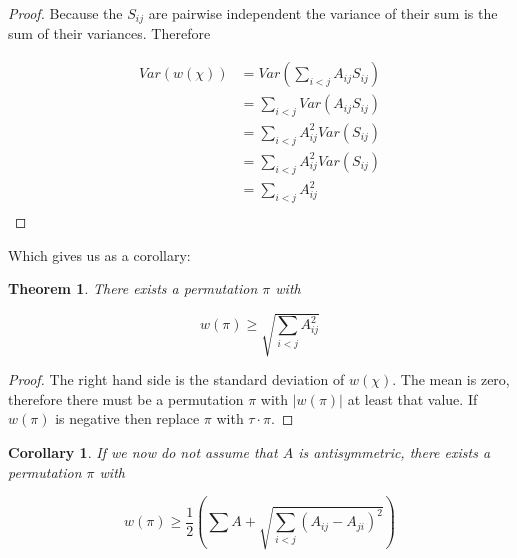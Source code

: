 \documentclass[a4paper,10pt]{article}
\newtheorem{theorem}{Theorem}
\newtheorem{corollary}{Corollary}[theorem]
\begin{document}
\begin{proof}
Because the $S_{ij}$ are pairwise independent the variance of their sum is the sum of their variances. Therefore

\begin{align*}
Var(w(\chi)) &= Var(\sum_{i < j} A_{ij} S_{ij}) \\
&= \sum_{i < j} Var(A_{ij} S_{ij}) \\
&= \sum_{i < j} A_{ij}^2 Var(S_{ij}) \\
&= \sum_{i < j} A_{ij}^2 Var(S_{ij}) \\
&= \sum_{i < j} A_{ij}^2  \\
\end{align*}
\end{proof}

Which gives us as a corollary:

\begin{theorem}
There exists a permutation $\pi$ with 

\[ w(\pi) \geq \sqrt{ \sum_{i < j} A_{ij}^2  } \]
\end{theorem}

\begin{proof}
The right hand side is the standard deviation of $w(\chi)$. The mean is zero, therefore there must be a permutation $\pi$ with $|w(\pi)|$ at least that value. If $w(\pi)$ is negative then replace $\pi$ with $\tau \cdot \pi$.
\end{proof}

\begin{corollary}
If we now do not assume that $A$ is antisymmetric, there exists a permutation $\pi$ with

\[ w(\pi) \geq \frac{1}{2} \left( \sum A + \sqrt{ \sum_{i < j} (A_{ij} - A_{ji})^2  } \right) \]
\end{corollary}
\end{document}
